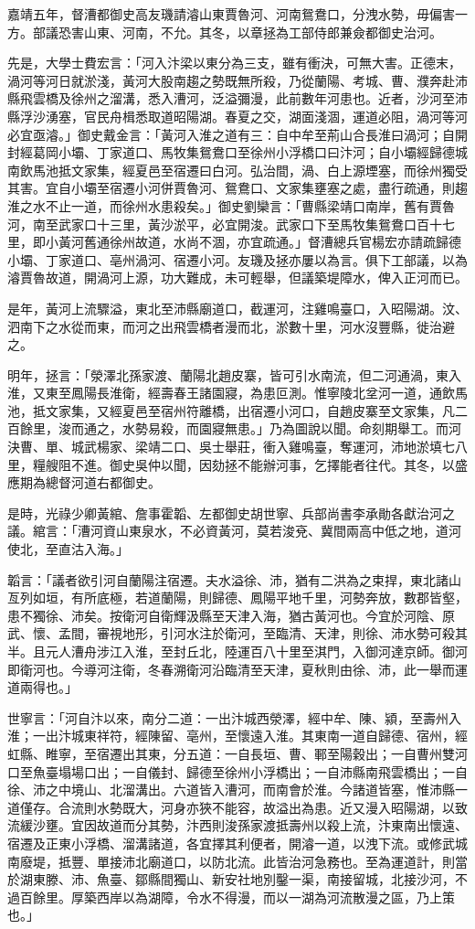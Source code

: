 嘉靖五年，督漕都御史高友璣請濬山東賈魯河、河南鴛鴦口，分洩水勢，毋偏害一方。部議恐害山東、河南，不允。其冬，以章拯為工部侍郎兼僉都御史治河。

先是，大學士費宏言：「河入汴梁以東分為三支，雖有衝決，可無大害。正德末，渦河等河日就淤淺，黃河大股南趨之勢既無所殺，乃從蘭陽、考城、曹、濮奔赴沛縣飛雲橋及徐州之溜溝，悉入漕河，泛溢彌漫，此前數年河患也。近者，沙河至沛縣浮沙湧塞，官民舟楫悉取道昭陽湖。春夏之交，湖面淺涸，運道必阻，渦河等河必宜亟濬。」御史戴金言：「黃河入淮之道有三：自中牟至荊山合長淮曰渦河；自開封經葛岡小壩、丁家道口、馬牧集鴛鴦口至徐州小浮橋口曰汴河；自小壩經歸德城南飲馬池抵文家集，經夏邑至宿遷曰白河。弘治間，渦、白上源堙塞，而徐州獨受其害。宜自小壩至宿遷小河併賈魯河、鴛鴦口、文家集壅塞之處，盡行疏通，則趨淮之水不止一道，而徐州水患殺矣。」御史劉欒言：「曹縣梁靖口南岸，舊有賈魯河，南至武家口十三里，黃沙淤平，必宜開浚。武家口下至馬牧集鴛鴦口百十七里，即小黃河舊通徐州故道，水尚不涸，亦宜疏通。」督漕總兵官楊宏亦請疏歸德小壩、丁家道口、亳州渦河、宿遷小河。友璣及拯亦屢以為言。俱下工部議，以為濬賈魯故道，開渦河上源，功大難成，未可輕舉，但議築堤障水，俾入正河而已。

是年，黃河上流驟溢，東北至沛縣廟道口，截運河，注雞鳴臺口，入昭陽湖。汶、泗南下之水從而東，而河之出飛雲橋者漫而北，淤數十里，河水沒豐縣，徙治避之。

明年，拯言：「滎澤北孫家渡、蘭陽北趙皮寨，皆可引水南流，但二河通渦，東入淮，又東至鳳陽長淮衛，經壽春王諸園寢，為患叵測。惟寧陵北坌河一道，通飲馬池，抵文家集，又經夏邑至宿州符離橋，出宿遷小河口，自趙皮寨至文家集，凡二百餘里，浚而通之，水勢易殺，而園寢無患。」乃為圖說以聞。命刻期舉工。而河決曹、單、城武楊家、梁靖二口、吳士舉莊，衝入雞鳴臺，奪運河，沛地淤填七八里，糧艘阻不進。御史吳仲以聞，因劾拯不能辦河事，乞擇能者往代。其冬，以盛應期為總督河道右都御史。

是時，光祿少卿黃綰、詹事霍韜、左都御史胡世寧、兵部尚書李承勛各獻治河之議。綰言：「漕河資山東泉水，不必資黃河，莫若浚兗、冀間兩高中低之地，道河使北，至直沽入海。」

韜言：「議者欲引河自蘭陽注宿遷。夫水溢徐、沛，猶有二洪為之束捍，東北諸山亙列如垣，有所底極，若道蘭陽，則歸德、鳳陽平地千里，河勢奔放，數郡皆壑，患不獨徐、沛矣。按衛河自衛輝汲縣至天津入海，猶古黃河也。今宜於河陰、原武、懷、孟間，審視地形，引河水注於衛河，至臨清、天津，則徐、沛水勢可殺其半。且元人漕舟涉江入淮，至封丘北，陸運百八十里至淇門，入御河達京師。御河即衛河也。今導河注衛，冬春溯衛河沿臨清至天津，夏秋則由徐、沛，此一舉而運道兩得也。」

世寧言：「河自汴以來，南分二道：一出汴城西滎澤，經中牟、陳、潁，至壽州入淮；一出汴城東祥符，經陳留、亳州，至懷遠入淮。其東南一道自歸德、宿州，經虹縣、睢寧，至宿遷出其東，分五道：一自長垣、曹、鄆至陽穀出；一自曹州雙河口至魚臺塌場口出；一自儀封、歸德至徐州小浮橋出；一自沛縣南飛雲橋出；一自徐、沛之中境山、北溜溝出。六道皆入漕河，而南會於淮。今諸道皆塞，惟沛縣一道僅存。合流則水勢既大，河身亦狹不能容，故溢出為患。近又漫入昭陽湖，以致流緩沙壅。宜因故道而分其勢，汴西則浚孫家渡抵壽州以殺上流，汴東南出懷遠、宿遷及正東小浮橋、溜溝諸道，各宜擇其利便者，開濬一道，以洩下流。或修武城南廢堤，抵豐、單接沛北廟道口，以防北流。此皆治河急務也。至為運道計，則當於湖東滕、沛、魚臺、鄒縣間獨山、新安社地別鑿一渠，南接留城，北接沙河，不過百餘里。厚築西岸以為湖障，令水不得漫，而以一湖為河流散漫之區，乃上策也。」

